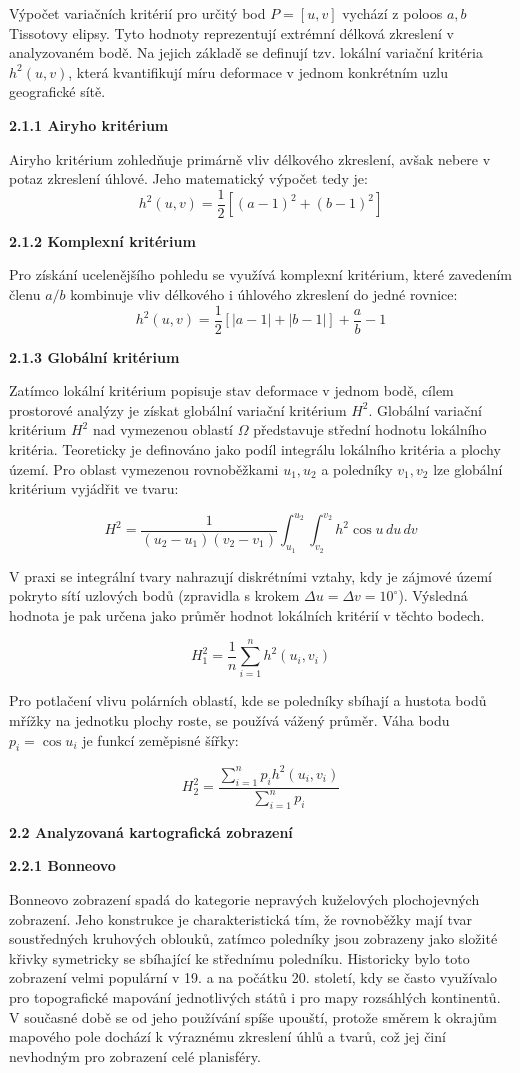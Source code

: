 \documentclass[12pt]{article}
\begin{document}
Výpočet variačních kritérií pro určitý bod $P = [u, v]$ vychází z poloos $a, b$ Tissotovy elipsy. Tyto hodnoty reprezentují extrémní délková zkreslení v analyzovaném bodě. Na jejich základě se definují tzv. lokální variační kritéria $h^2(u,v)$, která kvantifikují míru deformace v jednom konkrétním uzlu geografické sítě.

\textbf{2.1.1 Airyho kritérium}

Airyho kritérium zohledňuje primárně vliv délkového zkreslení, avšak nebere v potaz zkreslení úhlové. Jeho matematický výpočet tedy je:
$$h^2(u,v)=\frac{1}{2}[(a-1)^2+(b-1)^2]$$

\textbf{2.1.2 Komplexní kritérium}

Pro získání ucelenějšího pohledu se využívá komplexní kritérium, které zavedením členu $a/b$ kombinuje vliv délkového i úhlového zkreslení do jedné rovnice:
$$h^2(u,v)=\frac{1}{2}[|a-1|+|b-1|]+\frac{a}{b}-1$$

\textbf{2.1.3 Globální kritérium}

Zatímco lokální kritérium popisuje stav deformace v jednom bodě, cílem prostorové analýzy je získat globální variační kritérium $H^2$. Globální variační kritérium $H^2$ nad vymezenou oblastí $\Omega$ představuje střední hodnotu lokálního kritéria. Teoreticky je definováno jako podíl integrálu lokálního kritéria a plochy území. Pro oblast vymezenou rovnoběžkami $u_1, u_2$ a poledníky $v_1, v_2$ lze globální kritérium vyjádřit ve tvaru:

$$H^2=\frac{1}{(u_2-u_1)(v_2-v_1)}\int_{u_1}^{u_2}\int_{v_2}^{v_2}h^2 \cos u \, du \, dv$$

\newpage
V praxi se integrální tvary nahrazují diskrétními vztahy, kdy je zájmové území pokryto sítí uzlových bodů (zpravidla s krokem $\Delta u = \Delta v = 10^{\circ}$). Výsledná hodnota je pak určena jako průměr hodnot lokálních kritérií v těchto bodech.

$$H_1^2 = \frac{1}{n} \sum_{i=1}^{n} h^2(u_i, v_i)$$

Pro potlačení vlivu polárních oblastí, kde se poledníky sbíhají a hustota bodů mřížky na jednotku plochy roste, se používá vážený průměr. Váha bodu $p_i = \cos u_i$ je funkcí zeměpisné šířky:

$$H_2^2 = \frac{\sum_{i=1}^{n} p_i h^2(u_i, v_i)}{\sum_{i=1}^{n} p_i}$$

\textbf{2.2 Analyzovaná kartografická zobrazení}

\textbf{2.2.1 Bonneovo}

Bonneovo zobrazení spadá do kategorie nepravých kuželových plochojevných zobrazení. Jeho konstrukce je charakteristická tím, že rovnoběžky mají tvar soustředných kruhových oblouků, zatímco poledníky jsou zobrazeny jako složité křivky symetricky se sbíhající ke střednímu poledníku. Historicky bylo toto zobrazení velmi populární v 19. a na počátku 20. století, kdy se často využívalo pro topografické mapování jednotlivých států i pro mapy rozsáhlých kontinentů. V současné době se od jeho používání spíše upouští, protože směrem k okrajům mapového pole dochází k výraznému zkreslení úhlů a tvarů, což jej činí nevhodným pro zobrazení celé planisféry.
\end{document}
